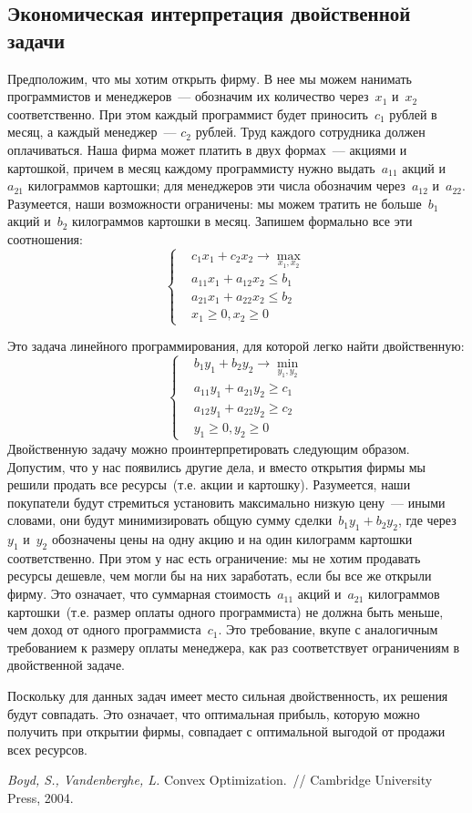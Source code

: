 \documentclass[12pt,fleqn]{article}
\begin{document}
\subsection{Экономическая интерпретация двойственной задачи}
Предположим, что мы хотим открыть фирму.
В нее мы можем нанимать программистов и менеджеров~--- обозначим их количество через~$x_1$ и~$x_2$ соответственно.
При этом каждый программист будет приносить~$c_1$ рублей в месяц, а каждый менеджер~--- $c_2$ рублей.
Труд каждого сотрудника должен оплачиваться.
Наша фирма может платить в двух формах~--- акциями и картошкой, причем
в месяц каждому программисту нужно выдать~$a_{11}$ акций и~$a_{21}$ килограммов картошки;
для менеджеров эти числа обозначим через~$a_{12}$ и~$a_{22}$.
Разумеется, наши возможности ограничены: мы можем тратить не больше~$b_1$ акций и~$b_2$ килограммов
картошки в месяц.
Запишем формально все эти соотношения:
\[
    \left\{
    \begin{aligned}
        &c_1 x_1 + c_2 x_2 \to \max_{x_1, x_2}\\
        &a_{11} x_1 + a_{12} x_2 \leq b_1\\
        &a_{21} x_1 + a_{22} x_2 \leq b_2\\
        &x_1 \geq 0, x_2 \geq 0
    \end{aligned}
    \right.
\]

Это задача линейного программирования, для которой легко найти двойственную:
\[
    \left\{
    \begin{aligned}
        &b_1 y_1 + b_2 y_2 \to \min_{y_1, y_2}\\
        &a_{11} y_1 + a_{21} y_2 \geq c_1\\
        &a_{12} y_1 + a_{22} y_2 \geq c_2\\
        &y_1 \geq 0, y_2 \geq 0
    \end{aligned}
    \right.
\]
Двойственную задачу можно проинтерпретировать следующим образом.
Допустим, что у нас появились другие дела, и вместо открытия фирмы
мы решили продать все ресурсы~(т.е. акции и картошку).
Разумеется, наши покупатели будут стремиться установить максимально низкую цену~---
иными словами, они будут минимизировать общую сумму сделки~$b_1 y_1 + b_2 y_2$,
где через~$y_1$ и~$y_2$ обозначены цены на одну акцию и на один килограмм картошки соответственно.
При этом у нас есть ограничение: мы не хотим продавать ресурсы дешевле, чем могли бы на них заработать,
если бы все же открыли фирму.
Это означает, что суммарная стоимость~$a_{11}$ акций и~$a_{21}$ килограммов
картошки~(т.е. размер оплаты одного программиста) не должна быть меньше, чем
доход от одного программиста~$c_1$.
Это требование, вкупе с аналогичным требованием к размеру оплаты менеджера,
как раз соответствует ограничениям в двойственной задаче.

Поскольку для данных задач имеет место сильная двойственность,
их решения будут совпадать.
Это означает, что оптимальная прибыль, которую можно получить при открытии фирмы,
совпадает с оптимальной выгодой от продажи всех ресурсов.


\begin{thebibliography}{1}
    \emph{Boyd, S., Vandenberghe, L.}
    Convex Optimization.~// Cambridge University Press, 2004.
\end{thebibliography}
\end{document}
